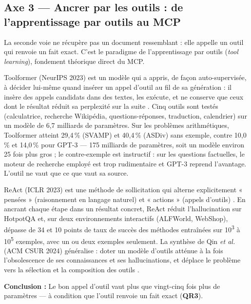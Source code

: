 \FloatBarrier
\subsection{Axe 3 --- Ancrer par les outils : de l'apprentissage par outils au MCP}\label{sec:axe3}

La seconde voie ne récupère pas un document ressemblant : elle appelle un outil qui renvoie un fait exact. C'est le paradigme de l'apprentissage par outils (\emph{tool learning}), fondement théorique direct du MCP.


Toolformer (NeurIPS 2023) est un modèle qui a appris, de façon auto-supervisée, à décider lui-même quand insérer un appel d'outil au fil de sa génération : il insère des appels candidats dans des textes, les exécute, et ne conserve que ceux dont le résultat réduit sa perplexité sur la suite \cite{toolformer}. Cinq outils sont testés (calculatrice, recherche Wikipédia, questions-réponses, traduction, calendrier) sur un modèle de 6,7 milliards de paramètres. Sur les problèmes arithmétiques, Toolformer atteint 29,4\,\% (SVAMP) et 40,4\,\% (ASDiv) sans exemple, contre 10,0\,\% et 14,0\,\% pour GPT-3 --- 175 milliards de paramètres, soit un modèle environ 25 fois plus gros ; le contre-exemple est instructif : sur les questions factuelles, le moteur de recherche employé est trop rudimentaire et GPT-3 reprend l'avantage. L'outil ne vaut que ce que vaut sa source.

ReAct (ICLR 2023) est une méthode de sollicitation qui alterne explicitement « pensées » (raisonnement en langage naturel) et « actions » (appels d'outils) \cite{react}. En ancrant chaque étape dans un résultat concret, ReAct réduit l'hallucination sur HotpotQA et, sur deux environnements interactifs (ALFWorld, WebShop), dépasse de 34 et 10 points de taux de succès des méthodes entraînées sur 10\textsuperscript{3} à 10\textsuperscript{5} exemples, avec un ou deux exemples seulement. La synthèse de Qin \emph{et al.} (ACM CSUR 2024) généralise : doter un modèle d'outils atténue à la fois l'obsolescence de ses connaissances et ses hallucinations, et déplace le problème vers la sélection et la composition des outils \cite{qin}.

\begin{encadre}
\textbf{Conclusion :} Le bon appel d'outil vaut plus que vingt-cinq fois plus de paramètres --- à condition que l'outil renvoie un fait exact (\textbf{QR3}).
\end{encadre}

